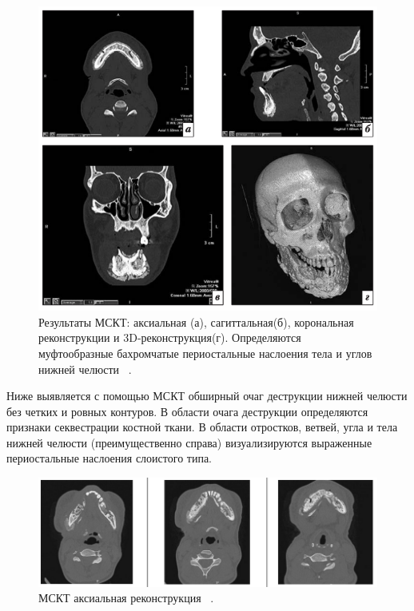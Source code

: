 \documentclass[11pt]{article}
\begin{document}
	
	\begin{figure}[H]
		\centering
		\includegraphics[width=\textwidth]{mskt1}
		\caption{Результаты МСКТ: аксиальная (а), сагиттальная(б), корональная реконструкции и 3D-реконструкция(г). Определяются муфтообразные бахромчатые периостальные наслоения тела и углов нижней челюсти ~\cite{80-157-1-SM}. }
		\label{fig:mskt1}
	\end{figure}

 Ниже выявляется с помощью МСКТ обширный очаг деструкции нижней челюсти без четких и ровных контуров. В области очага деструкции определяются признаки секвестрации костной ткани. В области отростков, ветвей, угла и тела нижней челюсти (преимущественно справа) визуализируются выраженные периостальные наслоения слоистого типа.
 
 	\begin{figure}[H]
 	\centering
 	\includegraphics[width=\textwidth]{mskt2}
 	\caption{МСКТ аксиальная реконструкция ~\cite{rejr}. }
 	\label{fig:mskt2}
	 \end{figure}
\end{document}
